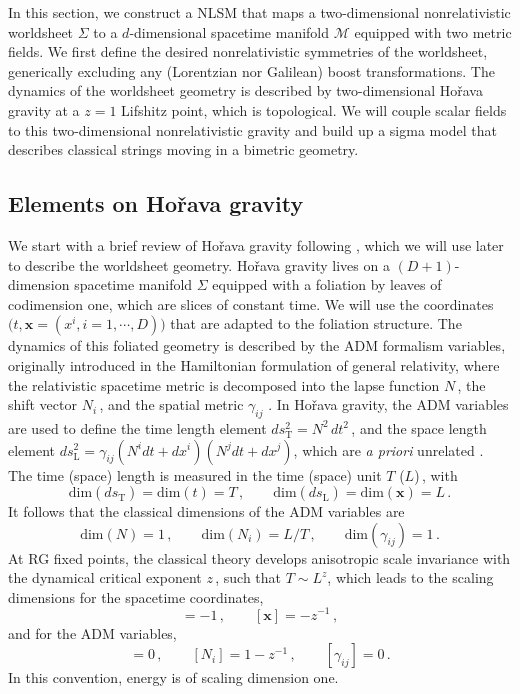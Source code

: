\documentclass[11pt]{article}
\newcommand{\be}{\begin{equation}}
\newcommand{\ee}{\end{equation}}
\newcommand{\CM}{\mathcal{M}}
\newcommand{\lr}{\left (}
\newcommand{\rr}{\right )}
\begin{document}
In this section, we construct a NLSM that maps a two-dimensional nonrelativistic worldsheet $\Sigma$ to a $d$-dimensional spacetime manifold $\CM$ equipped with two metric fields. We first define the desired nonrelativistic symmetries of the worldsheet, generically excluding any (Lorentzian nor Galilean) boost transformations. The dynamics of the worldsheet geometry is described by two-dimensional Ho\v{r}ava gravity at a $z=1$ Lifshitz point, which is topological. We will couple scalar fields to this two-dimensional nonrelativistic gravity and build up a sigma model that describes classical strings moving in a bimetric geometry. 

\subsection{Elements on \texorpdfstring{Ho\v{r}ava}{Horava} gravity} \label{sec:ehg}

We start with a brief review of Ho\v{r}ava gravity following \cite{Horava:2008ih, Horava:2009uw}, which we will use later to describe the worldsheet geometry. Ho\v{r}ava gravity lives on a $(D+1)$-dimension spacetime manifold $\Sigma$ equipped with a foliation by leaves of codimension one, which are slices of constant time. We will use the coordinates $\bigl(t, \mathbf{x} \! = \! (x^i, i = 1, \cdots\!, D) \bigr)$ that are adapted to the foliation structure. The dynamics of this foliated geometry is described by the ADM formalism variables, originally introduced in the Hamiltonian formulation of general relativity, where the relativistic spacetime metric is decomposed into the lapse function $N$\,, the shift vector $N_i$\,, and the spatial metric $\gamma_{ij}$ \cite{Arnowitt:1959ah}. In Ho\v{r}ava gravity, the ADM variables are used to define the time length element
%
$ds_{\text{T}}^2 = N^2 \, dt^2$\,,
%
and the space length element 
%
$ds_{\text{L}}^2 = \gamma_{ij} \lr N^i dt + d x^i \rr \lr N^j dt + d x^j \rr$,	
%
which are \emph{a priori} unrelated \cite{Frenkel:2020djn}.
The time (space) length is measured in the time (space) unit $T$ ($L$)\,, with
%
\be
	\text{dim} (ds^{}_\text{T}) = \text{dim}(t) = T\,, 
		\qquad
	\text{dim} (ds^{}_\text{L}) = \text{dim} (\mathbf{x}) = L\,. 
\ee
%
It follows that the classical dimensions of the ADM variables are
%
\be
	\text{dim} (N) = 1\,,
		\qquad
	\text{dim} (N_i) = L/T\,,
		\qquad
	\text{dim} (\gamma_{ij}) = 1\,. 
\ee
%
At RG fixed points, the classical theory develops anisotropic scale invariance with the dynamical critical exponent $z$\,, such that $T \sim L^z$, which leads to the scaling dimensions for the spacetime coordinates,
%
\be
	[t] = -1\,,
		\qquad
	[\mathbf{x}] = - z^{-1}\,,
\ee
%
and for the ADM variables,
%
\be
	[N] = 0\,,
		\qquad
	[N_i] = 1 - z^{-1}\,,
		\qquad
	[\gamma_{ij}] = 0\,.
\ee
%
In this convention, energy is of scaling dimension one. 
\end{document}
